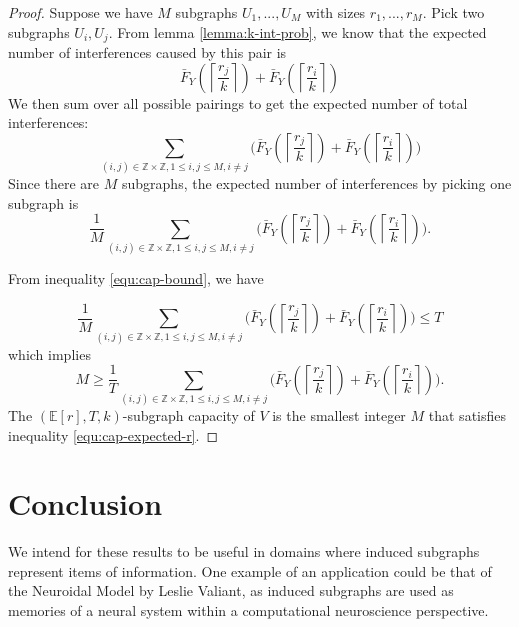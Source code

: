 \documentclass[10pt]{extarticle}
\newcommand{\Z}{\mathbb{Z}}
\newcommand{\E}{\mathbb{E}}
\theoremstyle{definition}
\begin{document}
\begin{proof}
    Suppose we have $M$ subgraphs $U_1,...,U_M$ with sizes $r_1,...,r_M$. Pick two subgraphs $U_i,U_j$. From lemma \ref{lemma:k-int-prob}, we know that the expected number of interferences caused by this pair is
    $$
    \bar{F}_Y\left(\left\lceil \frac{r_j}{k} \right\rceil\right) + \bar{F}_Y\left(\left\lceil \frac{r_i}{k} \right\rceil\right)
    $$
    We then sum over all possible pairings to get the expected number of total interferences:
    $$
    \sum_{(i,j) \in \Z\times\Z, 1 \le i,j \le M, i \ne j} \Biggl( \bar{F}_Y\left(\left\lceil \frac{r_j}{k} \right\rceil\right) + \bar{F}_Y\left(\left\lceil \frac{r_i}{k} \right\rceil\right) \Biggr)
    $$
    Since there are $M$ subgraphs, the expected number of interferences by picking one subgraph is
    $$
    \frac{1}{M} \sum_{(i,j) \in \Z\times\Z, 1 \le i,j \le M, i \ne j}  \Biggl( \bar{F}_Y\left(\left\lceil \frac{r_j}{k} \right\rceil\right) + \bar{F}_Y\left(\left\lceil \frac{r_i}{k} \right\rceil\right) \Biggr).
    $$

\noindent From inequality \ref{equ:cap-bound}, we have 

\begin{equation*}
      \frac{1}{M} \sum_{(i,j) \in \Z\times\Z, 1 \le i,j \le M, i \ne j}  \Biggl( \bar{F}_Y\left(\left\lceil \frac{r_j}{k} \right\rceil\right) + \bar{F}_Y\left(\left\lceil \frac{r_i}{k} \right\rceil\right) \Biggr)  \le T 
\end{equation*}
\noindent which implies
\begin{equation}
\label{equ:cap-expected-r}      
       M \geq \frac{1}{T}\sum_{(i,j) \in \Z\times\Z, 1 \le i,j \le M, i \ne j}  \Biggl( \bar{F}_Y\left(\left\lceil \frac{r_j}{k} \right\rceil\right) + \bar{F}_Y\left(\left\lceil \frac{r_i}{k} \right\rceil\right)\Biggr). 
\end{equation}
The $(\E[r],T,k)$-subgraph capacity of $V$ is the smallest integer $M$ that satisfies inequality \ref{equ:cap-expected-r}.
    
\end{proof}

\section{Conclusion}

We intend for these results to be useful in domains where induced subgraphs represent items of information. One example of an application could be that of the Neuroidal Model by Leslie Valiant, as induced subgraphs are used as memories of a neural system within a computational neuroscience perspective.
\end{document}

